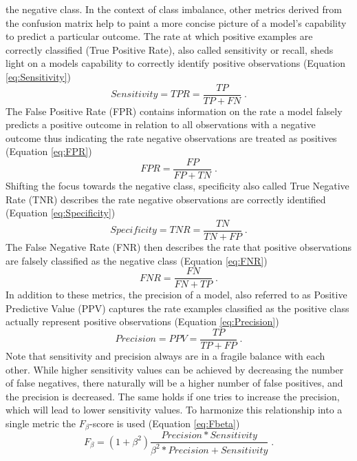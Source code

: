 \documentclass[a4paper,11pt]{article}
\begin{document}
the negative class. In the context of class imbalance, other metrics derived
from the confusion matrix help to paint a more concise picture of a model's
capability to predict a particular outcome.
The rate at which positive examples are correctly classified (True Positive Rate),
also called sensitivity or recall, sheds light on a models capability to
correctly identify positive observations (Equation \eqref{eq:Sensitivity})
\begin{equation}
Sensitivity = TPR = \frac{TP}{TP+FN}\;.
\label{eq:Sensitivity}
\end{equation}
The False Positive Rate (FPR) contains information on the rate a model falsely
predicts a positive outcome in relation to all observations with a negative outcome
thus indicating the rate negative observations are treated as positives (Equation \eqref{eq:FPR})
\begin{equation}
FPR = \frac{FP}{FP+TN}\;.
\label{eq:FPR}
\end{equation}
Shifting the focus towards the negative class, specificity also called True
Negative Rate (TNR) describes the rate negative observations are correctly
identified (Equation \eqref{eq:Specificity})
\begin{equation}
Specificity = TNR = \frac{TN}{TN+FP}\;.
\label{eq:Specificity}
\end{equation}
The False Negative Rate (FNR) then describes the rate that positive observations
are falsely classified as the negative class (Equation \eqref{eq:FNR})
\begin{equation}
FNR = \frac{FN}{FN+TP}\;.
\label{eq:FNR}
\end{equation}
In addition to these metrics, the precision of a model, also referred to as Positive
Predictive Value (PPV) captures the rate examples classified as the positive
class actually represent positive observations (Equation \eqref{eq:Precision})
\begin{equation}
Precision = PPV = \frac{TP}{TP+FP}\;.
\label{eq:Precision}
\end{equation}
Note that sensitivity and precision always are in a fragile balance with each other.
While higher sensitivity values can be achieved by decreasing the number of false
negatives, there naturally will be a higher number of false positives, and the precision
is decreased. The same holds if one tries to increase the precision, which will lead to
lower sensitivity values. To harmonize this relationship into a
single metric the \(F_\beta\)-score is used (Equation \eqref{eq:Fbeta})
\begin{equation}
F_\beta = (1+\beta^2)\frac{Precision*Sensitivity}{\beta^2*Precision+Sensitivity}\;.
\label{eq:Fbeta}
\end{equation}
\end{document}
